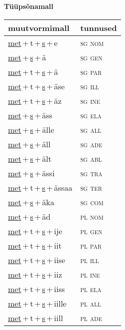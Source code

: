 
\vspace{1.8em}
\begin{minipage}{\textwidth}
\textbf{Tüüpsõnamall \,}\\

\begin{sideways}
\begin{tabular}{l l}
muutvormimall & tunnused \\
\hline
\underline{met}\,+\,t\,+\,\underline{s}\,+\,e & \textsc{ sg nom } \\
\underline{met}\,+\,\underline{s}\,+\,ä & \textsc{ sg gen } \\
\underline{met}\,+\,t\,+\,\underline{s}\,+\,ä & \textsc{ sg par } \\
\underline{met}\,+\,t\,+\,\underline{s}\,+\,äse & \textsc{ sg ill } \\
\underline{met}\,+\,t\,+\,\underline{s}\,+\,äz & \textsc{ sg ine } \\
\underline{met}\,+\,\underline{s}\,+\,äss & \textsc{ sg ela } \\
\underline{met}\,+\,\underline{s}\,+\,älle & \textsc{ sg all } \\
\underline{met}\,+\,\underline{s}\,+\,äll & \textsc{ sg ade } \\
\underline{met}\,+\,\underline{s}\,+\,ält & \textsc{ sg abl } \\
\underline{met}\,+\,\underline{s}\,+\,ässi & \textsc{ sg tra } \\
\underline{met}\,+\,t\,+\,\underline{s}\,+\,ässaa & \textsc{ sg ter } \\
\underline{met}\,+\,\underline{s}\,+\,äka & \textsc{ sg com } \\
\underline{met}\,+\,\underline{s}\,+\,äd & \textsc{ pl nom } \\
\underline{met}\,+\,t\,+\,\underline{s}\,+\,ije & \textsc{ pl gen } \\
\underline{met}\,+\,t\,+\,\underline{s}\,+\,iit & \textsc{ pl par } \\
\underline{met}\,+\,t\,+\,\underline{s}\,+\,iise & \textsc{ pl ill } \\
\underline{met}\,+\,t\,+\,\underline{s}\,+\,iiz & \textsc{ pl ine } \\
\underline{met}\,+\,t\,+\,\underline{s}\,+\,iiss & \textsc{ pl ela } \\
\underline{met}\,+\,t\,+\,\underline{s}\,+\,iille & \textsc{ pl all } \\
\underline{met}\,+\,t\,+\,\underline{s}\,+\,iill & \textsc{ pl ade } \\

\end{tabular}
\end{sideways}
\end{minipage}
